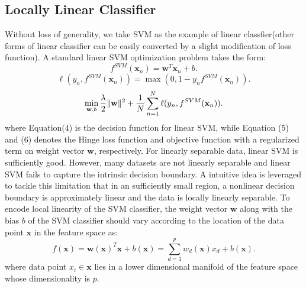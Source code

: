 \documentclass{llncs}
\DeclarePairedDelimiter\norm{\lVert}{\rVert}
\def \x {\mathbf{x}}
\def \w {\mathbf{w}}
\begin{document}
	\subsection{Locally Linear Classifier}
	Without loss of generality, we take SVM as the example of linear classfier(other forms of linear classifier can be easily converted by a slight modification of loss function). A standard linear SVM optimization problem takes the form:
	\begin{equation}
	f^{SVM}(\x_n) = \w^T\x_n + b.
	\end{equation}	
	\begin{equation}
	\ell(y_n,f^{SVM}(\x_n))=\max(0,1-y_nf^{SVM}(\x_n)).
	\end{equation}
	\begin{equation}
	\min_{\w,b} \frac{\lambda}{2}\norm{\w}^2 + \frac{1}{N}\sum_{n=1}^{N}\ell(y_n,f^{SVM}(\x_n)).
	\end{equation}
	where Equation(4) is the decision function for linear SVM, while Equation (5) and (6) denotes the Hinge loss function and objective function with a regularized term on weight vector $\w$, respectively. For linearly separable data, linear SVM is sufficiently good. However, many datasets are not linearly separable and linear SVM fails to capture the intrinsic decision boundary. A intuitive idea is leveraged to tackle this limitation that in an sufficiently small region, a nonlinear decision boundary is approximately linear and the data is locally linearly separable. To encode local linearity of the SVM classifier, the weight vector $\w$ along with the bias $b$ of the SVM classifier should vary according to the location of the data point $\x$ in the feature space as:
	\begin{equation}
	f(\x) = \w(\x)^T\x + b(\x) = \sum_{d=1}^{p}w_d(\x)x_d+b(\x).
	\end{equation}
	where data point $x_i \in \x$ lies in a lower dimensional manifold of the feature space whose dimensionality is $p$.
	
\end{document}
